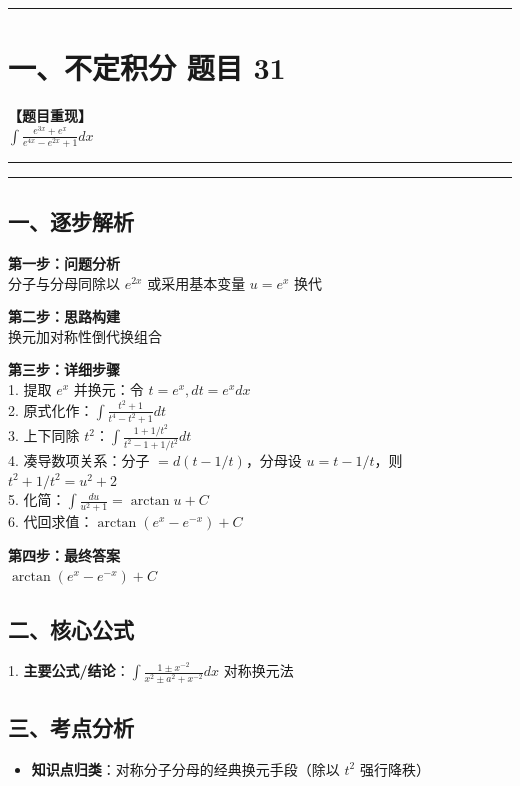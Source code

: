 ﻿\documentclass[12pt, a4paper]{ctexart}
\newcommand{\TopSeparator}{
    \par\noindent\rule{\textwidth}{1.5pt}\vspace{0.5em}
}
\newcommand{\AnalysisSeparator}{
    \par\noindent\rule{\textwidth}{0.5pt}\vspace{0.2em}\hrule\vspace{0.5em}
}
\newenvironment{RedAnalysis}{
    \par
    \color{red} 
}{
    \par
    \color{black} 
}
\begin{document}
\vspace{2em}

\TopSeparator
\section*{一、不定积分 题目 31}

\textbf{【题目重现】} \\
$\int \frac{e^{3x}+e^x}{e^{4x}-e^{2x}+1} dx$

\AnalysisSeparator

\begin{RedAnalysis}

	\subsection*{一、逐步解析}

	\textbf{第一步：问题分析} \\
	分子与分母同除以 $e^{2x}$ 或采用基本变量 $u=e^x$ 换代

	\textbf{第二步：思路构建} \\
	换元加对称性倒代换组合

	\textbf{第三步：详细步骤} \\
	1. 提取 $e^x$ 并换元：令 $t = e^x, dt = e^x dx$ \\ 
	2. 原式化作：$\int \frac{t^2+1}{t^4-t^2+1} dt$ \\ 
	3. 上下同除 $t^2$：$\int \frac{1 + 1/t^2}{t^2 - 1 + 1/t^2} dt$ \\ 
	4. 凑导数项关系：分子 $= d(t - 1/t)$，分母设 $u = t - 1/t$，则 $t^2 + 1/t^2 = u^2 + 2$ \\ 
	5. 化简：$\int \frac{du}{u^2+1} = \arctan u + C$ \\ 
	6. 代回求值：$\arctan(e^x - e^{-x}) + C$

	\textbf{第四步：最终答案} \\
	$\arctan(e^x - e^{-x}) + C$

	\subsection*{二、核心公式}
	1. \textbf{主要公式/结论}：$\int \frac{1 \pm x^{-2}}{x^2 \pm a^2 + x^{-2}} dx \text{ 对称换元法}$

	\subsection*{三、考点分析}
	\begin{itemize}
		\item \textbf{知识点归类}：对称分子分母的经典换元手段（除以 $t^2$ 强行降秩）
	\end{itemize}

\end{RedAnalysis}
\end{document}
